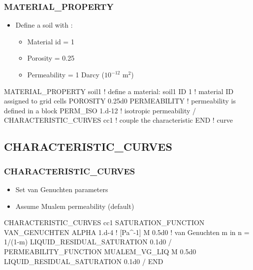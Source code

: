 \documentclass{beamer}
\newcommand\bluecomment[1]{{{\color{blue} #1}}}
\newcommand\greencomment[1]{{{\color{green} #1}}}
\begin{document}
\begin{frame}\frametitle{MATERIAL\_PROPERTY}

\begin{itemize}
  \item Define a soil with :
  \begin{itemize}
    \item Material id = 1
    \item Porosity = 0.25
    \item Permeability = 1 Darcy ($10^{-12}$ m$^2$)
  \end{itemize}
\end{itemize}

\begin{semiverbatim}
MATERIAL_PROPERTY soil1  \bluecomment{! define a material:} \greencomment{soil1}
  ID 1             \bluecomment{! material ID assigned to grid cells}
  POROSITY 0.25d0
  PERMEABILITY     \bluecomment{! permeability is defined in a block}
    PERM_ISO 1.d-12  \bluecomment{! isotropic permeability}
  /
  CHARACTERISTIC\_CURVES cc1 \bluecomment{! couple the characteristic}
END                         \bluecomment{!   curve}
\end{semiverbatim}

\end{frame}

\subsection{CHARACTERISTIC\_CURVES}

\begin{frame}[fragile]\frametitle{CHARACTERISTIC\_CURVES}

\begin{itemize}
\item Set van Genuchten parameters
\item Assume Mualem permeability (default)
\end{itemize}

\begin{semiverbatim}
CHARACTERISTIC_CURVES cc1
  SATURATION_FUNCTION VAN_GENUCHTEN
    ALPHA  1.d-4   \bluecomment{! [Pa^-1]}
    M 0.5d0        \bluecomment{! van Genuchten m in n = 1/(1-m)}
    LIQUID_RESIDUAL_SATURATION 0.1d0
  /
  PERMEABILITY_FUNCTION MUALEM_VG_LIQ
    M 0.5d0
    LIQUID_RESIDUAL_SATURATION 0.1d0
  /
END
\end{semiverbatim}

\end{frame}
\end{document}
